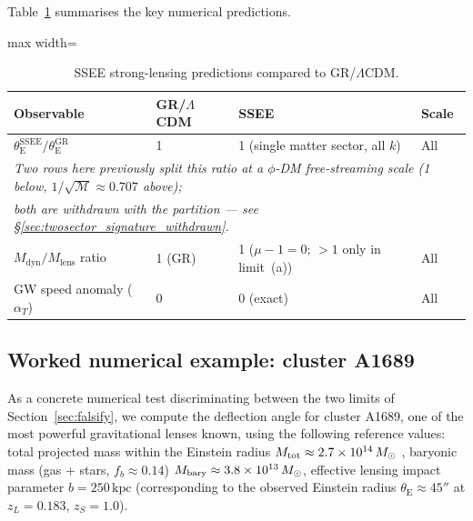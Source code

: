 \documentclass[12pt,a4paper]{article}
\newcommand{\MIRA}{\mathcal{M}}
\newcommand{\thetaE}{\theta_{\mathrm{E}}}
\begin{document}
Table~\ref{tab:lensing_numbers} summarises the key numerical predictions.

\begin{table}[h]
\centering
\caption{SSEE strong-lensing predictions compared to GR/$\Lambda$CDM.}
\label{tab:lensing_numbers}
\begin{adjustbox}{max width=\textwidth}
\begin{tabular}{llll}
\toprule
\textbf{Observable} & \textbf{GR/$\Lambda$CDM} & \textbf{SSEE} & \textbf{Scale} \\
\midrule
$\thetaE^{\mathrm{SSEE}}/\thetaE^{\mathrm{GR}}$
  & 1
  & 1 (single matter sector, all $k$)
  & All \\
\multicolumn{4}{l}{\footnotesize\emph{Two rows here previously split this ratio at a
$\phi$-DM free-streaming scale (1 below, $1/\sqrt{\MIRA}\approx0.707$ above);}} \\
\multicolumn{4}{l}{\footnotesize\emph{both are withdrawn with the partition ---
see \S\ref{sec:twosector_signature_withdrawn}.}} \\
$M_{\mathrm{dyn}}/M_{\mathrm{lens}}$ ratio
  & 1 (GR)
  & 1 ($\mu-1=0$; $>1$ only in limit~(a))
  & All \\
GW speed anomaly ($\alpha_T$)
  & 0
  & 0 (exact)
  & All \\
\bottomrule
\end{tabular}
\end{adjustbox}
\end{table}

\subsection{Worked numerical example: cluster A1689}
\label{sec:a1689}

As a concrete numerical test discriminating between the two limits of
Section~\ref{sec:falsify}, we compute the deflection angle for cluster
A1689, one of the most powerful gravitational lenses known, using the
following reference values: total projected mass within the Einstein
radius $M_{\rm tot} \approx 2.7\times10^{14}\,M_\odot$
\citep{Limousin2007}, baryonic mass (gas + stars, $f_b\approx 0.14$)
$M_{\rm bary} \approx 3.8\times10^{13}\,M_\odot$, effective lensing
impact parameter $b = 250\,\mathrm{kpc}$ (corresponding to the observed
Einstein radius $\thetaE\approx45''$ at $z_L=0.183$, $z_S=1.0$).
\end{document}
